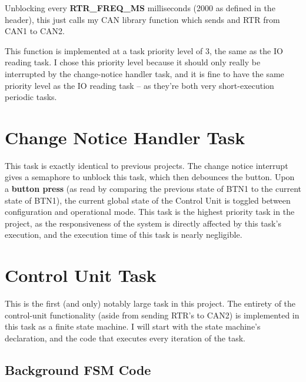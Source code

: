 \documentclass[a4paper, 12pt]{article}
\begin{document}
Unblocking every \textbf{RTR\_FREQ\_MS} milliseconds (2000 as defined in the header), this just calls my CAN library function which sends and RTR from CAN1 to CAN2. 

This function is implemented at a task priority level of 3, the same as the IO reading task. I chose this priority level because it should only really be interrupted by the change-notice handler task, and it is fine to have the same priority level as the IO reading task -- as they're both very short-execution periodic tasks.

\section{Change Notice Handler Task}
\label{sec:change-notice-handler-task}

This task is exactly identical to previous projects. The change notice interrupt gives a semaphore to unblock this task, which then debounces the button. Upon a \textbf{button press} (as read by comparing the previous state of BTN1 to the current state of BTN1), the current global state of the Control Unit is toggled between configuration and operational mode. This task is the highest priority task in the project, as the responsiveness of the system is directly affected by this task's execution, and the execution time of this task is nearly negligible.

\section{Control Unit Task}
\label{sec:control-unit-task}

This is the first (and only) notably large task in this project. The entirety of the control-unit functionality (aside from sending RTR's to CAN2) is implemented in this task as a finite state machine. I will start with the state machine's declaration, and the code that executes every iteration of the task.

\subsection{Background FSM Code}
\end{document}

